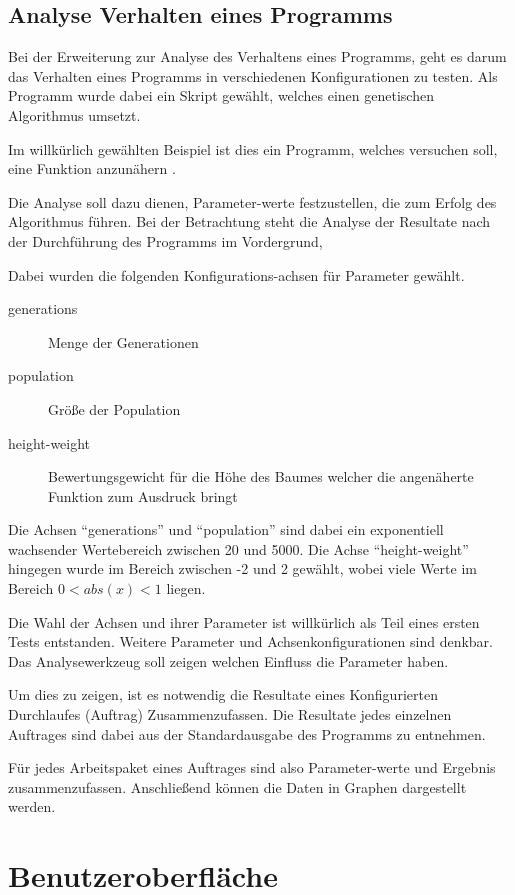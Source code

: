 \subsection{Analyse Verhalten eines Programms}

Bei der Erweiterung zur Analyse des Verhaltens eines Programms,
geht es darum das Verhalten eines Programms
in verschiedenen Konfigurationen zu testen.
Als Programm wurde dabei ein Skript gewählt,
welches einen genetischen Algorithmus umsetzt.

Im willkürlich gewählten Beispiel ist dies ein Programm,
welches versuchen soll, eine Funktion anzunähern \cite{gen:prog}.

Die Analyse soll dazu dienen, Parameter-werte festzustellen,
die zum Erfolg des Algorithmus führen.
Bei der Betrachtung steht die Analyse der Resultate nach der Durchführung des Programms im Vordergrund,

Dabei wurden die folgenden Konfigurations-achsen für Parameter gewählt.

\begin{description}
    \item[generations] Menge der Generationen
    \item[population] Größe der Population
    \item[height-weight] Bewertungsgewicht für die Höhe des Baumes welcher die angenäherte Funktion zum Ausdruck bringt
\end{description}

Die Achsen ``generations'' und ``population'' sind dabei ein exponentiell wachsender Wertebereich zwischen 20 und 5000.
Die Achse ``height-weight'' hingegen wurde im Bereich zwischen -2 und 2 gewählt,
wobei viele Werte im Bereich $ 0<abs(x)<1$ liegen.

Die Wahl der Achsen und ihrer Parameter ist willkürlich als Teil eines ersten Tests entstanden.
Weitere Parameter und Achsenkonfigurationen sind denkbar.
Das Analysewerkzeug soll zeigen welchen Einfluss die Parameter haben.

Um dies zu zeigen, ist es notwendig die Resultate
eines Konfigurierten Durchlaufes (Auftrag) Zusammenzufassen.
Die Resultate jedes einzelnen Auftrages sind dabei aus der Standardausgabe
des Programms zu entnehmen.

Für jedes Arbeitspaket eines Auftrages sind also Parameter-werte und Ergebnis zusammenzufassen.
Anschließend können die Daten in Graphen dargestellt werden.


\section{Benutzeroberfläche}

